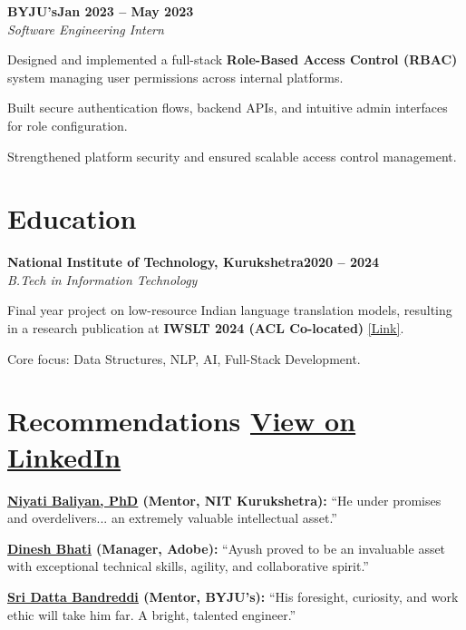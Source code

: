 \documentclass[letterpaper,10pt]{article}
\newcommand{\heading}[2]{
  \hspace{10pt}#1\hfill#2\\
}
\newcommand{\headingBf}[2]{
  \heading{\textbf{#1}}{\textbf{#2}}
}
\newcommand{\headingIt}[2]{
  \heading{\textit{#1}}{\textit{#2}}
}
\newenvironment{resume_list}{
  \vspace{-7pt}
  \begin{itemize}[itemsep=-2px, parsep=1pt, leftmargin=30pt]
}{
  \end{itemize}
}
\begin{document}
  \headingBf{BYJU's}{Jan 2023 -- May 2023}
  \headingIt{Software Engineering Intern}{}
  \begin{resume_list}
    \item Designed and implemented a full-stack \textbf{Role-Based Access Control (RBAC)} system managing user permissions across internal platforms.
    \item Built secure authentication flows, backend APIs, and intuitive admin interfaces for role configuration.
    \item Strengthened platform security and ensured scalable access control management.
  \end{resume_list}

  \section{Education}

  \headingBf{National Institute of Technology, Kurukshetra}{2020 -- 2024}
  \headingIt{B.Tech in Information Technology}{}
  \begin{resume_list}
    \item Final year project on low-resource Indian language translation models, resulting in a research publication at \textbf{IWSLT 2024 (ACL Co-located)} \href{https://aclanthology.org/2024.iwslt-1.37}{[Link]}.
    \item Core focus: Data Structures, NLP, AI, Full-Stack Development.
  \end{resume_list}

\section{Recommendations \hspace{2pt} {\footnotesize \underline{\href{https://www.linkedin.com/in/ayushannand/details/recommendations/}{View on LinkedIn}}}}


\begin{resume_list}
  \item \textbf{\underline{\href{https://www.linkedin.com/in/niyati-baliyan-phd-42a629222/}{Niyati Baliyan, PhD}} (Mentor, NIT Kurukshetra):} “He under promises and overdelivers... an extremely valuable intellectual asset.”
  \item \textbf{\underline{\href{https://www.linkedin.com/in/dinesh-bhati/}{Dinesh Bhati}} (Manager, Adobe):} “Ayush proved to be an invaluable asset with exceptional technical skills, agility, and collaborative spirit.”
  \item \textbf{\underline{\href{https://www.linkedin.com/in/ayushannand/details/recommendations/}{Sri Datta Bandreddi}} (Mentor, BYJU's):} “His foresight, curiosity, and work ethic will take him far. A bright, talented engineer.”
\end{resume_list}
\end{document}
